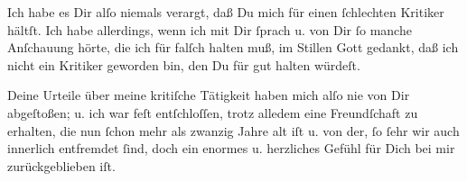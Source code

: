 \pstart
           Ich habe es Dir alſo niemals verargt, daß Du mich für einen{ }ſchlechten Kritiker
               hältſt. Ich habe allerdings, wenn ich mit Dir{ }ſprach u. von Dir{ }ſo manche Anſchauung
               hörte, die ich für falſch halten muß, im Stillen Gott gedankt, daß ich nicht ein
               Kritiker geworden bin, den Du für gut halten würdeſt.\pend
           
\pstart
           {\pb}Deine Urteile über meine kritiſche Tätigkeit
               haben mich alſo nie von Dir abgeſtoßen; u. ich war feſt entſchloſſen, trotz alledem
                  \strikeout{\textcolor{gray}{Dir}} eine Freundſchaft zu erhalten, die nun{ }ſchon mehr als zwanzig Jahre alt
                  iſt\strikeout{,} u. von der,{ }ſo{ }ſehr wir auch innerlich
               entfremdet{ }ſind, doch ein enormes u. herzliches Gefühl für Dich bei mir
               zurückgeblieben iſt. \strikeout{\textcolor{gray}{×}}\pend
           

